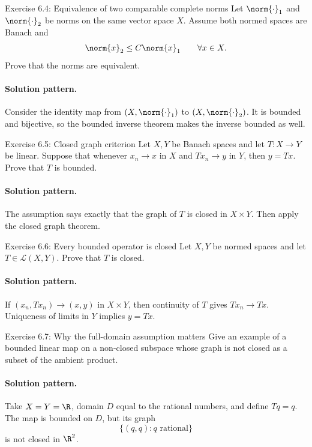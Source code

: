 \documentclass[header={Lecture 6 Exam Study Notes}]{study-note}
\begin{document}
\begin{exbox}{Exercise 6.4: Equivalence of two comparable complete norms}
Let $\norm{\cdot}_1$ and $\norm{\cdot}_2$ be norms on the same vector space $X$. Assume both normed spaces are Banach and
\[
\norm{x}_2\le C\norm{x}_1 \qquad \forall x\in X.
\]
Prove that the norms are equivalent.

\paragraph{Solution pattern.}
Consider the identity map from $(X,\norm{\cdot}_1)$ to $(X,\norm{\cdot}_2)$. It is bounded and bijective, so the bounded inverse theorem makes the inverse bounded as well.
\end{exbox}

\begin{exbox}{Exercise 6.5: Closed graph criterion}
Let $X,Y$ be Banach spaces and let $T:X\to Y$ be linear. Suppose that whenever $x_n\to x$ in $X$ and $Tx_n\to y$ in $Y$, then $y=Tx$. Prove that $T$ is bounded.

\paragraph{Solution pattern.}
The assumption says exactly that the graph of $T$ is closed in $X\times Y$. Then apply the closed graph theorem.
\end{exbox}

\begin{exbox}{Exercise 6.6: Every bounded operator is closed}
Let $X,Y$ be normed spaces and let $T\in\mathcal L(X,Y)$. Prove that $T$ is closed.

\paragraph{Solution pattern.}
If $(x_n,Tx_n)\to (x,y)$ in $X\times Y$, then continuity of $T$ gives $Tx_n\to Tx$. Uniqueness of limits in $Y$ implies $y=Tx$.
\end{exbox}

\begin{exbox}{Exercise 6.7: Why the full-domain assumption matters}
Give an example of a bounded linear map on a non-closed subspace whose graph is not closed as a subset of the ambient product.

\paragraph{Solution pattern.}
Take $X=Y=\R$, domain $D$ equal to the rational numbers, and define $Tq=q$. The map is bounded on $D$, but its graph
\[
\{(q,q): q \text{ rational}\}
\]
is not closed in $\R^2$.
\end{exbox}
\end{document}
